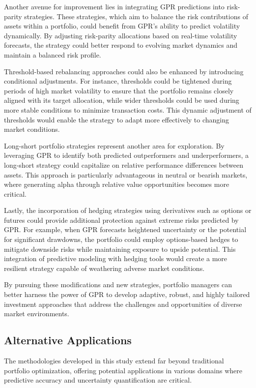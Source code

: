 Another avenue for improvement lies in integrating GPR predictions into risk-parity strategies. These strategies, which aim to balance the risk contributions of assets within a portfolio, could benefit from GPR's ability to predict volatility dynamically. By adjusting risk-parity allocations based on real-time volatility forecasts, the strategy could better respond to evolving market dynamics and maintain a balanced risk profile.

Threshold-based rebalancing approaches could also be enhanced by introducing conditional adjustments. For instance, thresholds could be tightened during periods of high market volatility to ensure that the portfolio remains closely aligned with its target allocation, while wider thresholds could be used during more stable conditions to minimize transaction costs. This dynamic adjustment of thresholds would enable the strategy to adapt more effectively to changing market conditions.

Long-short portfolio strategies represent another area for exploration. By leveraging GPR to identify both predicted outperformers and underperformers, a long-short strategy could capitalize on relative performance differences between assets. This approach is particularly advantageous in neutral or bearish markets, where generating alpha through relative value opportunities becomes more critical.

Lastly, the incorporation of hedging strategies using derivatives such as options or futures could provide additional protection against extreme risks predicted by GPR. For example, when GPR forecasts heightened uncertainty or the potential for significant drawdowns, the portfolio could employ options-based hedges to mitigate downside risks while maintaining exposure to upside potential. This integration of predictive modeling with hedging tools would create a more resilient strategy capable of weathering adverse market conditions.

By pursuing these modifications and new strategies, portfolio managers can better harness the power of GPR to develop adaptive, robust, and highly tailored investment approaches that address the challenges and opportunities of diverse market environments.

\subsection{Alternative Applications}
The methodologies developed in this study extend far beyond traditional portfolio optimization, offering potential applications in various domains where predictive accuracy and uncertainty quantification are critical.

